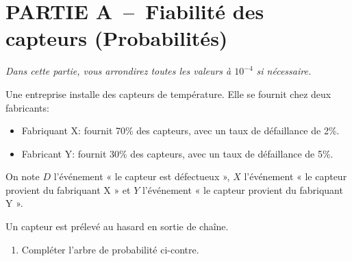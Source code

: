 
\pagestyle{DS_FP}

\bigskip

\section*{PARTIE A~--~Fiabilité des capteurs (Probabilités)}

\medskip

\emph{Dans cette partie, vous arrondirez toutes les valeurs à $10^{-4}$ si nécessaire.}

\medskip

 \begin{minipage}{0.48\textwidth}
Une entreprise installe des capteurs de température. Elle se fournit chez deux fabricants:
\begin{itemize}
    \item Fabriquant X: fournit 70\% des capteurs, avec un taux de défaillance de 2\%.    
    \item Fabricant Y: fournit 30\% des capteurs, avec un taux de défaillance de 5\%.
\end{itemize}

On note $D$ l'événement « le capteur est défectueux », $X$ l'événement « le capteur provient du fabriquant X » et $Y$ l'événement « le capteur provient du fabriquant Y ».

Un capteur est prélevé au hasard en sortie de chaîne.

\medskip

\begin{enumerate}[series=monDS, resume]
    \item Compléter l'arbre de probabilité ci-contre.
\end{enumerate}

\end{minipage}\hfill{}
